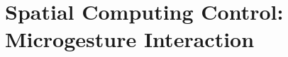 \documentclass [11pt, proquest] {uwthesis}[2020/02/24]
\begin{document}













 

\section{Spatial Computing Control: Microgesture Interaction}
\end{document}
